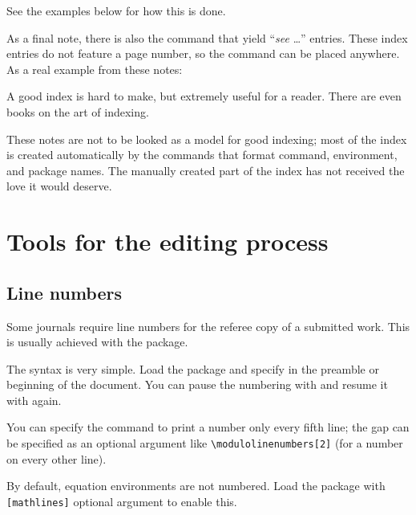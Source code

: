 See the examples below for how this is done.
\begin{ExampleCode}
\end{ExampleCode}

As a final note, there is also the  command
that yield ``\emph{see} \dots'' entries.
These index entries do not feature a page number,
so the command can be placed anywhere.
As a real example from these notes:
\begin{ExampleCode}
\end{ExampleCode}


\begin{practices}
A good index is hard to make, but extremely useful for a reader.
There are even books on the art of indexing.

These notes are not to be looked as a model for good indexing;
most of the index is created automatically by the commands
that format command, environment, and package names.
The manually created part of the index has not received the love it would deserve.
\end{practices}



%
%
%
\section{Tools for the editing process}

%
\subsection{Line numbers}

Some journals require line numbers for the referee copy of a submitted work.
This is usually achieved with the  package.

The syntax is very simple.
Load the package and specify  in the preamble or beginning of the document.
You can pause the numbering with  and resume it with  again.

You can specify the  command to print a number only every fifth line;
the gap can be specified as an optional argument like \verb|\modulolinenumbers[2]|
(for a number on every other line).

By default, equation environments are not numbered.
Load the package with \verb|[mathlines]| optional argument to enable this.

